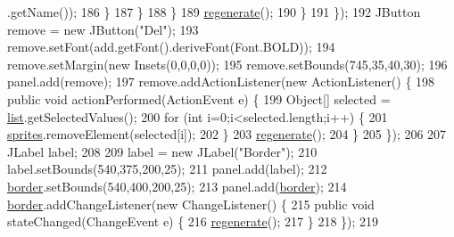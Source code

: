 \begin{DoxyCode}
      .getName());
186                         \}
187                     \}
188                 \}
189                 \mbox{\hyperlink{classorg_1_1newdawn_1_1slick_1_1tools_1_1packulike_1_1_packer_a7350e349de07dff645d4e146eef9f100}{regenerate}}();
190             \}
191         \});
192         JButton \textcolor{keyword}{remove} = \textcolor{keyword}{new} JButton(\textcolor{stringliteral}{"Del"});
193         \textcolor{keyword}{remove}.setFont(add.getFont().deriveFont(Font.BOLD));
194         \textcolor{keyword}{remove}.setMargin(\textcolor{keyword}{new} Insets(0,0,0,0));
195         \textcolor{keyword}{remove}.setBounds(745,35,40,30);
196         panel.add(\textcolor{keyword}{remove});
197         \textcolor{keyword}{remove}.addActionListener(\textcolor{keyword}{new} ActionListener() \{
198             \textcolor{keyword}{public} \textcolor{keywordtype}{void} actionPerformed(ActionEvent e) \{
199                 Object[] selected = \mbox{\hyperlink{classorg_1_1newdawn_1_1slick_1_1tools_1_1packulike_1_1_packer_a45e8438e951eb84f2efaf06e5ae481bd}{list}}.getSelectedValues();
200                 \textcolor{keywordflow}{for} (\textcolor{keywordtype}{int} i=0;i<selected.length;i++) \{
201                     \mbox{\hyperlink{classorg_1_1newdawn_1_1slick_1_1tools_1_1packulike_1_1_packer_a5684e96219ce89e574c4550d3c650eaa}{sprites}}.removeElement(selected[i]);
202                 \}
203                 \mbox{\hyperlink{classorg_1_1newdawn_1_1slick_1_1tools_1_1packulike_1_1_packer_a7350e349de07dff645d4e146eef9f100}{regenerate}}();
204             \}
205         \});
206         
207         JLabel label;
208 
209         label = \textcolor{keyword}{new} JLabel(\textcolor{stringliteral}{"Border"});
210         label.setBounds(540,375,200,25);
211         panel.add(label);
212         \mbox{\hyperlink{classorg_1_1newdawn_1_1slick_1_1tools_1_1packulike_1_1_packer_ad52e9b53a46d3aa9a1b2f66755558055}{border}}.setBounds(540,400,200,25);
213         panel.add(\mbox{\hyperlink{classorg_1_1newdawn_1_1slick_1_1tools_1_1packulike_1_1_packer_ad52e9b53a46d3aa9a1b2f66755558055}{border}});
214         \mbox{\hyperlink{classorg_1_1newdawn_1_1slick_1_1tools_1_1packulike_1_1_packer_ad52e9b53a46d3aa9a1b2f66755558055}{border}}.addChangeListener(\textcolor{keyword}{new} ChangeListener() \{
215             \textcolor{keyword}{public} \textcolor{keywordtype}{void} stateChanged(ChangeEvent e) \{
216                 \mbox{\hyperlink{classorg_1_1newdawn_1_1slick_1_1tools_1_1packulike_1_1_packer_a7350e349de07dff645d4e146eef9f100}{regenerate}}();
217             \}
218         \});
219         

\end{DoxyCode}
